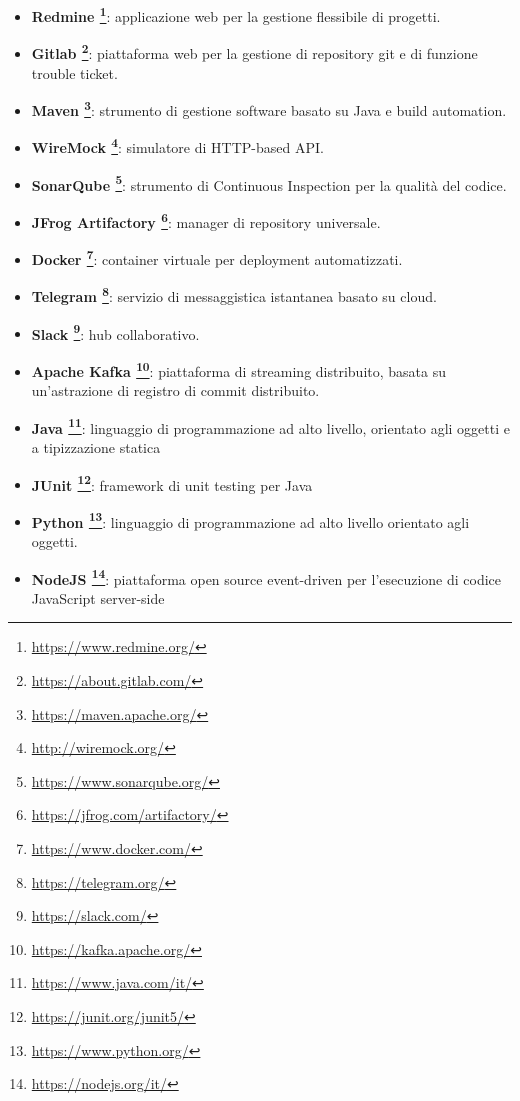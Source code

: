 	\begin{itemize}
		\item \textbf{Redmine \footnote{\hyperref[Link al sito]{https://www.redmine.org/}}}: applicazione web per la gestione flessibile di progetti. 
		\item \textbf{Gitlab \footnote{\hyperref[Link al sito]{https://about.gitlab.com/}}}: piattaforma web per la gestione di repository git e di funzione trouble ticket.
		\item \textbf{Maven \footnote{\hyperref[Link al sito]{https://maven.apache.org/}}}: strumento di gestione software basato su Java e build automation. 
		\item \textbf{WireMock \footnote{\hyperref[Link al sito]{http://wiremock.org/}}}: simulatore di HTTP-based API. 
		\item \textbf{SonarQube \footnote{\hyperref[Link al sito]{https://www.sonarqube.org/}}}: strumento di Continuous Inspection per la qualità del codice. 
		\item \textbf{JFrog Artifactory \footnote{\hyperref[Link al sito]{https://jfrog.com/artifactory/}}}: manager di repository universale. 
		\item \textbf{Docker \footnote{\hyperref[Link al sito]{https://www.docker.com/}}}: container virtuale per deployment automatizzati. 
		\item \textbf{Telegram \footnote{\hyperref[Link al sito]{https://telegram.org/}}}: servizio di messaggistica istantanea basato su cloud. 
		\item \textbf{Slack \footnote{\hyperref[Link al sito]{https://slack.com/}}}: hub collaborativo. 
		\item \textbf{Apache Kafka \footnote{\hyperref[Link al sito]{https://kafka.apache.org/}}}: piattaforma di streaming distribuito, basata su un'astrazione di registro di commit distribuito. 
		\item \textbf{Java \footnote{\hyperref[Link al sito]{https://www.java.com/it/}}}:  linguaggio di programmazione ad alto livello, orientato agli oggetti e a tipizzazione statica
		\item \textbf{JUnit \footnote{\hyperref[Link al sito]{https://junit.org/junit5/}}}: framework di unit testing per Java
		\item \textbf{Python \footnote{\hyperref[Link al sito]{https://www.python.org/}}}: linguaggio di programmazione  ad alto livello orientato agli oggetti. 
		\item \textbf{NodeJS \footnote{\hyperref[Link al sito]{https://nodejs.org/it/}}}: piattaforma open source event-driven per l'esecuzione di codice JavaScript server-side
	\end{itemize}
	
